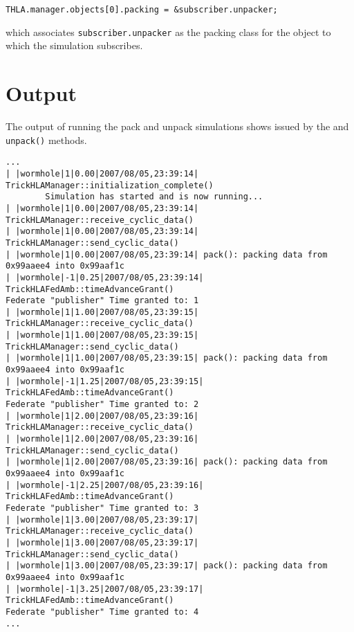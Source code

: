 \begin{verbatim}
THLA.manager.objects[0].packing = &subscriber.unpacker; \end{verbatim}

which associates {\tt subscriber.unpacker} as the packing class for
the object to which the simulation subscribes.

\section{Output}

The output of running the pack and unpack simulations
shows issued by the  and
{\tt unpack()} methods.

\begin{lstlisting}[numbers=none,caption={Output from the packer simulation}]
...
| |wormhole|1|0.00|2007/08/05,23:39:14| TrickHLAManager::initialization_complete()
        Simulation has started and is now running...
| |wormhole|1|0.00|2007/08/05,23:39:14| TrickHLAManager::receive_cyclic_data()
| |wormhole|1|0.00|2007/08/05,23:39:14| TrickHLAManager::send_cyclic_data()
| |wormhole|1|0.00|2007/08/05,23:39:14| pack(): packing data from 0x99aaee4 into 0x99aaf1c
| |wormhole|-1|0.25|2007/08/05,23:39:14| TrickHLAFedAmb::timeAdvanceGrant()
Federate "publisher" Time granted to: 1
| |wormhole|1|1.00|2007/08/05,23:39:15| TrickHLAManager::receive_cyclic_data()
| |wormhole|1|1.00|2007/08/05,23:39:15| TrickHLAManager::send_cyclic_data()
| |wormhole|1|1.00|2007/08/05,23:39:15| pack(): packing data from 0x99aaee4 into 0x99aaf1c
| |wormhole|-1|1.25|2007/08/05,23:39:15| TrickHLAFedAmb::timeAdvanceGrant()
Federate "publisher" Time granted to: 2
| |wormhole|1|2.00|2007/08/05,23:39:16| TrickHLAManager::receive_cyclic_data()
| |wormhole|1|2.00|2007/08/05,23:39:16| TrickHLAManager::send_cyclic_data()
| |wormhole|1|2.00|2007/08/05,23:39:16| pack(): packing data from 0x99aaee4 into 0x99aaf1c
| |wormhole|-1|2.25|2007/08/05,23:39:16| TrickHLAFedAmb::timeAdvanceGrant()
Federate "publisher" Time granted to: 3
| |wormhole|1|3.00|2007/08/05,23:39:17| TrickHLAManager::receive_cyclic_data()
| |wormhole|1|3.00|2007/08/05,23:39:17| TrickHLAManager::send_cyclic_data()
| |wormhole|1|3.00|2007/08/05,23:39:17| pack(): packing data from 0x99aaee4 into 0x99aaf1c
| |wormhole|-1|3.25|2007/08/05,23:39:17| TrickHLAFedAmb::timeAdvanceGrant()
Federate "publisher" Time granted to: 4
...
\end{lstlisting}

